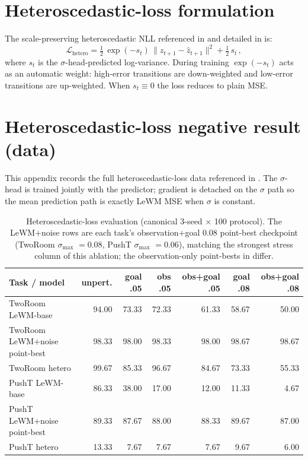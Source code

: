 \documentclass[10pt]{article}
\newcommand{\stdmax}{\ensuremath{\sigma_{\max}}}
\begin{document}
\section{Heteroscedastic-loss formulation}\label{sec:appendix-C}

The scale-preserving heteroscedastic NLL referenced in  and detailed in  is:
\begin{equation}
  \mathcal{L}_{\text{hetero}} = \tfrac{1}{2}\,\exp(-s_t)\,\| z_{t+1} - \hat z_{t+1}\|^2 + \tfrac{1}{2}\, s_t \,,
  \label{eq:hetero}
\end{equation}
where $s_t$ is the $\sigma$-head-predicted log-variance. During training $\exp(-s_t)$ acts as an automatic weight: high-error transitions are down-weighted and low-error transitions are up-weighted. When $s_t \equiv 0$ the loss reduces to plain MSE.

\section{Heteroscedastic-loss negative result (data)}\label{sec:appendix-D}

This appendix records the full heteroscedastic-loss data referenced in . The $\sigma$-head is trained jointly with the predictor; gradient is detached on the $\sigma$ path so the mean prediction path is exactly LeWM MSE when $\sigma$ is constant.

\begin{table}[H]
\centering
\caption{Heteroscedastic-loss evaluation (canonical 3-seed $\times$ 100 protocol). The LeWM+noise rows are each task's observation+goal 0.08 point-best checkpoint (TwoRoom \stdmax{} $= 0.08$, PushT \stdmax{} $= 0.06$), matching the strongest stress column of this ablation; the observation-only point-bests in  differ.}
\label{tab:hetero-eval}
\small
\setlength{\tabcolsep}{4pt}
\begin{tabular}{lrrrrrr}
\toprule
Task / model & unpert. & goal .05 & obs .05 & obs+goal .05 & goal .08 & obs+goal .08 \\
\midrule
TwoRoom LeWM-base       & 94.00 & 73.33 & 72.33 & 61.33 & 58.67 & 50.00 \\
TwoRoom LeWM+noise point-best & 98.33 & 98.00 & 98.33 & 98.00 & 98.67 & 98.67 \\
TwoRoom hetero          & 99.67 & 85.33 & 96.67 & 84.67 & 73.33 & 55.33 \\
PushT LeWM-base         & 86.33 & 38.00 & 17.00 & 12.00 & 11.33 &  4.67 \\
PushT LeWM+noise point-best   & 89.33 & 87.67 & 88.00 & 88.33 & 89.67 & 87.00 \\
PushT hetero   & 13.33 &  7.67 &  7.67 &  7.67 &  9.67 &  6.00 \\
\bottomrule
\end{tabular}%
\end{table}
\end{document}
